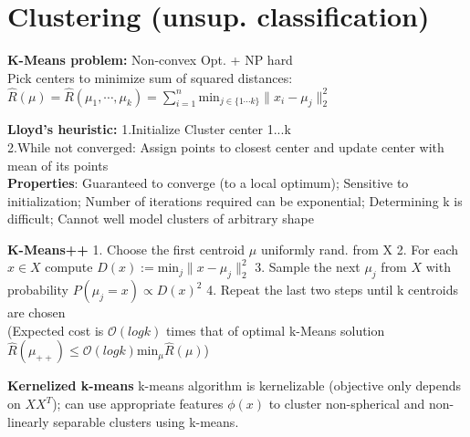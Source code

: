 
\section{Clustering (unsup. classification)}
    \textbf{K-Means problem:} Non-convex Opt. + NP hard\\
    Pick centers to minimize sum of squared distances: $\hat{R}(\mu) = \hat{R}(\mu_1, \cdots, \mu_k) = \sum_{i = 1}^{n} \mathrm{min}_{j \in \{ 1 \cdots k \} } \|x_i - \mu_j \|_2^2$
    
    \textbf{Lloyd’s heuristic:} 
    1.Initialize Cluster center 1...k\\
    2.While not converged: Assign points to closest center and update center with mean of its points \\
    \textbf{Properties}:
    Guaranteed to converge (to a local optimum); Sensitive to initialization; Number of iterations required can be exponential; Determining k is difficult; Cannot well model clusters of arbitrary shape
    
    \textbf{K-Means++}  
    1. Choose the first centroid $\mu$ uniformly rand. from X 
    2. For each $x \in X$ compute $D(x) := \mathrm{min}_j \|x - \mu_j \|_2^2$ 
    3. Sample the next $\mu_j$ from $X$ with probability $P(\mu_j = x) \propto D(x)^2$ 
    4. Repeat the last two steps until k centroids are chosen\\
    (Expected cost is $\mathcal{O}(log k)$ times that of optimal k-Means solution $\hat{R}(\mu_{++}) \leq \mathcal{O}(log k) \mathrm{min}_\mu \hat{R}(\mu)$)

    \textbf{Kernelized k-means} 
    k-means algorithm is kernelizable (objective only depends on $XX^T$); can use appropriate features $\phi(x)$ to cluster non-spherical and non-linearly separable clusters using k-means.
    
    